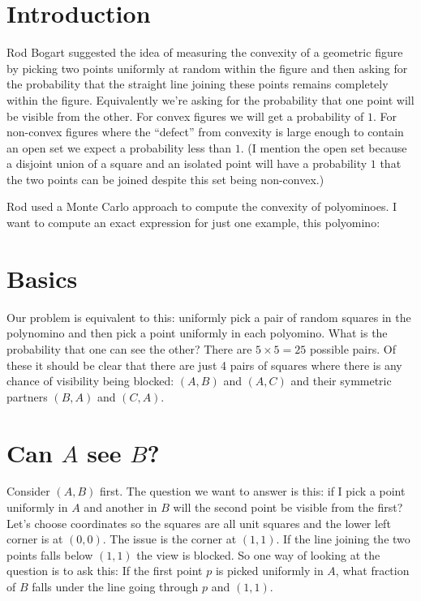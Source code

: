 \documentclass[12pt]{article}
\begin{document}
\section{Introduction}

Rod Bogart suggested the idea of measuring the convexity of a geometric figure by picking two points uniformly at random within the figure and then asking for the probability that the straight line joining these points remains completely within the figure.
Equivalently we're asking for the probability that one point will be visible from the other.
For convex figures we will get a probability of $1$.
For non-convex figures where the ``defect'' from convexity is large enough to contain an open set we expect a probability less than $1$.
(I mention the open set because a disjoint union of a square and an isolated point will have a probability $1$ that the two points can be joined despite this set being non-convex.)

Rod used a Monte Carlo approach to compute the convexity of polyominoes.
I want to compute an exact expression for just one example, this polyomino:

\begin{center}
\end{center}

\section{Basics}
Our problem is equivalent to this:
uniformly pick a pair of random squares in the polynomino and then pick a point uniformly in each polyomino.
What is the probability that one can see the other?
There are $5\times 5 = 25$ possible pairs.
Of these it should be clear that there are just 4 pairs of squares where there is any chance of visibility being blocked: $(A,B)$ and $(A, C)$ and their symmetric partners $(B,A)$ and $(C, A)$.

\begin{center}
\end{center}

\section{Can $A$ see $B$?}
Consider $(A,B)$ first.
The question we want to answer is this: if I pick a point uniformly in $A$ and another in $B$ will the second point be visible from the first?
Let's choose coordinates so the squares are all unit squares and the lower left corner is at $(0,0)$.
The issue is the corner at $(1,1)$.
If the line joining the two points falls below $(1,1)$ the view is blocked.
So one way of looking at the question is to ask this:
If the first point $p$ is picked uniformly in $A$, what fraction of $B$ falls under the line going through $p$ and $(1,1)$.
\end{document}
